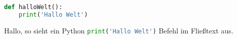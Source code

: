 \documentclass[12pt,ngerman,parskip=full]{scrartcl}
\begin{document}
\blindtext

\begin{lstlisting}[language={Python}]
def halloWelt():
    print('Hallo Welt')
\end{lstlisting}


Hallo, so sieht ein Python \lstinline[language={Python}]{print('Hallo Welt')} Befehl im Fließtext aus.
\end{document}
